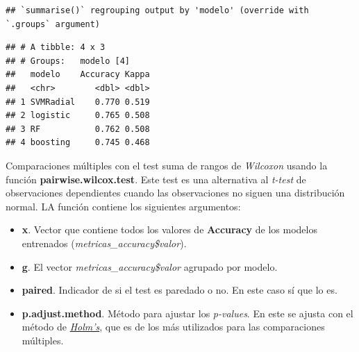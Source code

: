 \documentclass[]{article}
\newenvironment{Shaded}{\begin{snugshade}}{\end{snugshade}}
\newcommand{\DataTypeTok}[1]{\textcolor[rgb]{0.13,0.29,0.53}{#1}}
\newcommand{\KeywordTok}[1]{\textcolor[rgb]{0.13,0.29,0.53}{\textbf{#1}}}
\newcommand{\NormalTok}[1]{#1}
\newcommand{\OperatorTok}[1]{\textcolor[rgb]{0.81,0.36,0.00}{\textbf{#1}}}
\newcommand{\OtherTok}[1]{\textcolor[rgb]{0.56,0.35,0.01}{#1}}
\newcommand{\StringTok}[1]{\textcolor[rgb]{0.31,0.60,0.02}{#1}}
\providecommand{\tightlist}{%
  \setlength{\itemsep}{0pt}\setlength{\parskip}{0pt}}
\begin{document}
\begin{Shaded}
\end{Shaded}

\begin{verbatim}
## `summarise()` regrouping output by 'modelo' (override with `.groups` argument)
\end{verbatim}

\begin{verbatim}
## # A tibble: 4 x 3
## # Groups:   modelo [4]
##   modelo    Accuracy Kappa
##   <chr>        <dbl> <dbl>
## 1 SVMRadial    0.770 0.519
## 2 logistic     0.765 0.508
## 3 RF           0.762 0.508
## 4 boosting     0.745 0.468
\end{verbatim}

Comparaciones múltiples con el test suma de rangos de \emph{Wilcoxon}
usando la función \textbf{pairwise.wilcox.test}. Este test es una
alternativa al \emph{t-test} de observaciones dependientes cuando las
observaciones no siguen una distribución normal. LA función contiene los
siguientes argumentos:

\begin{itemize}
\tightlist
\item
  \textbf{x}. Vector que contiene todos los valores de \textbf{Accuracy}
  de los modelos entrenados (\emph{metricas\_accuracy\$valor}).
\item
  \textbf{g}. El vector \emph{metricas\_accuracy\$valor} agrupado por
  modelo.
\item
  \textbf{paired}. Indicador de si el test es paredado o no. En este
  caso sí que lo es.
\item
  \textbf{p.adjust.method}. Método para ajustar los \emph{p-values}. En
  este se ajusta con el método de
  \href{https://en.wikipedia.org/wiki/Holm\%E2\%80\%93Bonferroni_method}{\emph{Holm's}},
  que es de los más utilizados para las comparaciones múltiples.
\end{itemize}
\end{document}
